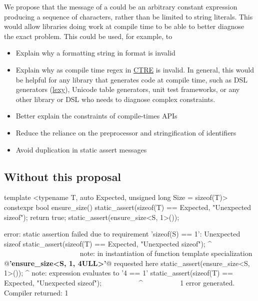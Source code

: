 \documentclass{wg21}
\begin{document}
We propose that the message of a  could be an arbitrary constant expression producing a sequence of characters,
rather than be limited to string literals.
This would allow libraries doing work at compile time to be able to better diagnose the exact problem.
This could be used, for example, to
\begin{itemize}
    \item Explain why a formatting string in format is invalid
    \item Explain why as compile time regex in \href{https://github.com/hanickadot/compile-time-regular-expressions}{CTRE} is invalid. In general, this would be helpful for any library that generates code at compile time, such as DSL generators (\href{https://github.com/foonathan/lexy}{lexy}), Unicode table generators, unit test frameworks, or any other library or DSL who needs to diagnose complex constraints.
    \item Better explain the constraints of compile-times APIs
    \item Reduce the reliance on the preprocessor and stringification of identifiers
    \item Avoid duplication in static assert messages
\end{itemize}

\pagebreak
\subsection{Without this proposal}

\begin{colorblock}
template <typename T, auto Expected, unsigned long Size = sizeof(T)>
constexpr bool ensure_size() {
    static_assert(sizeof(T) == Expected, "Unexpected sizeof");
    return true;
}
static_assert(ensure_size<S, 1>());
\end{colorblock}

\begin{quoteblock}
\begin{codeblock}
error: static assertion failed due to requirement 'sizeof(S) == 1':
    Unexpected sizeof
static_assert(sizeof(T) == Expected, "Unexpected sizeof");
^             ~~~~~~~~~~~~~~~~~~~~~
note: in instantiation of function template specialization
    @\textbf{'ensure_size<S, 1, 4ULL>'}@ requested here
static_assert(ensure_size<S, 1>());
^
note: expression evaluates to '4 == 1'
static_assert(sizeof(T) == Expected, "Unexpected sizeof");
~~~~~~~~~~^~~~~~~~~~~
1 error generated.
Compiler returned: 1
\end{codeblock}
\end{quoteblock}
\end{document}
